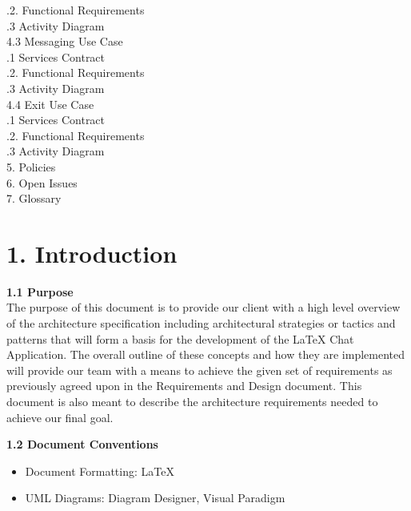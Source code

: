 \documentclass[29pt,a4paper]{moderncv}
\begin{document}
\begin{tabbing}
.2. Functional Requirements \\
.3 Activity Diagram \\
4.3 Messaging Use Case \> \\
.1 Services Contract \\
.2. Functional Requirements \\
.3 Activity Diagram \\
4.4 Exit Use Case \> \\
.1 Services Contract \\
.2. Functional Requirements \\
.3 Activity Diagram \\
5. Policies \> 			\\					
6. Open Issues \> 			\\				
7. Glossary \>  			\\				

\end{tabbing}
\newpage
	\section*{\textbf{1. Introduction}}
	\vspace{4mm}
	
		\textbf{1.1 Purpose}
			\\The purpose of this document is to provide our client with a high level overview of the architecture specification including architectural strategies or tactics and patterns that will form a basis for the development of the LaTeX Chat Application. The overall outline of these concepts and how they are implemented will provide our team with a means to achieve the given set of requirements as previously agreed upon in the Requirements and Design document. This document is also meant to describe the architecture requirements needed to achieve our final goal.\\
		\vspace{1mm}
		
		\noindent \textbf{1.2 Document Conventions}
			\begin{itemize}
				\item Document Formatting: LaTeX
				\item UML Diagrams: Diagram Designer, Visual Paradigm
			\end{itemize}
		\vspace{5mm}
		
\end{document}
